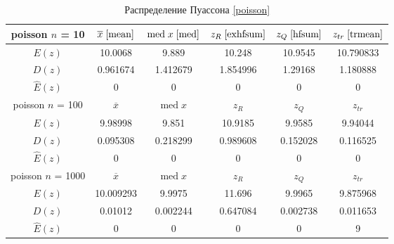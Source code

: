 \documentclass[a4paper,12pt]{article} %
\begin{document}
\begin{table}[H]
    \centering
    \begin{tabular}{|c|c|c|c|c|c|}
        \hline
         poisson $n$ = 10&$\overline{x}\;\eqref{mean}$&$\mathrm{med}\;x\;\eqref{med}$&$z_R\;\eqref{exhfsum}$&$z_Q\;\eqref{hfsum}$&$z_{tr}\;\eqref{trmean}$\\
        \hline
        $E(z)$&10.0068&9.889&10.248&10.9545&10.790833\\
        \hline
        $D(z)$&0.961674&1.412679&1.854996&1.29168&1.180888\\
        \hline
        $\hat{E}(z)$&0&0&0&0&0\\
        \hline
        poisson $n$ = 100&$\overline{x}$&$\mathrm{med}\;x$&$z_R$&$z_Q$&$z_{tr}$\\
        \hline
        $E(z)$&9.98998&9.851&10.9185&9.9585&9.94044\\
        \hline
        $D(z)$&0.095308&0.218299&0.989608&0.152028&0.116525\\
        \hline
        $\hat{E}(z)$&0&0&0&0&0\\
        \hline
        poisson $n$ = 1000 &$\overline{x}$&$\mathrm{med}\;x$&$z_R$&$z_Q$&$z_{tr}$\\
        \hline
        $E(z)$&10.009293&9.9975&11.696&9.9965&9.875968\\
        \hline
        $D(z)$&0.01012&0.002244&0.647084&0.002738&0.011653\\
        \hline
        $\hat{E}(z)$&0&0&0&0&9\\
        \hline
    \end{tabular}
    \caption{Распределение Пуассона \eqref{poisson}}
    \label{tab:poisson}
\end{table}
\end{document}
